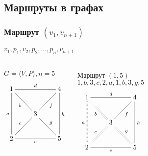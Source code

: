 \subsection{Маршруты в графах}

\begin{frame}
    \frametitle{Маршрут $(v_1,v_{n+1})$}
    \framesubtitle{$v_1,p_1,v_2,p_2,\ldots,p_{n},v_{n+1}$}

    \begin{columns}
            \begin{block}{$G=\langle V,P\rangle,n=5$}
                \[
                    {\xymatrix{
                        1 \ar@{-}[dd]_{a} \ar@{-}[rr]^{d} \ar@{-}[dr]_{b}
                            &*{}
                                &4 \ar@{-}[dd]^{h}
                                    \\
                        *{} 
                            &3 \ar@{-}[ur]_{f} \ar@{-}[dr]^{g}
                                &*{}
                                    \\
                        2  \ar@{-}[ur]^{c} \ar@{-}[rr]_{e}
                            &*{}
                                &5
                    }}
                \]
            \end{block}
        
            \begin{block}{Маршрут $(1,5)$ \\ $1,b,3,c,2,a,1,b,3,g,5$}
                \[
                    {\xymatrix{
                        1 \ar@{:}[dd]_{a} \ar@{-}[rr]^{d} \ar@{:}[dr]_{b}
                            &*{}
                                &4 \ar@{-}[dd]^{h}
                                    \\
                        *{} 
                            &3 \ar@{-}[ur]_{f} \ar@{:}[dr]^{g}
                                &*{}
                                    \\
                        2  \ar@{:}[ur]^{c} \ar@{-}[rr]_{e}
                            &*{}
                                &5
                    }}
                \]
            \end{block}
    \end{columns}
\end{frame}

